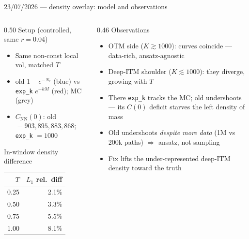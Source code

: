 \documentclass[aspectratio=169,11pt]{beamer}
\newcommand{\gold}[1]{{\color{ntugold}#1}}
\newcommand{\red}[1]{{\color{ntured}#1}}
\begin{document}
\begin{frame}{23/07/2026 --- density overlay: model and observations}
  \begin{columns}[T]
    \begin{column}{0.50\linewidth}
      \gold{Setup} (controlled, same $r{=}0.04$)
      \begin{itemize}\small
        \item Same non-const local vol, matched $T$
        \item old $1-e^{-N_c}$ (blue) vs \texttt{exp\_k} $e^{-kM}$ (red); MC (grey)
        \item $C_{\mathrm{NN}}(0)$: old $=903,895,883,868$;\; \texttt{exp\_k} $=1000$
      \end{itemize}
      \gold{In-window density difference}
      \begin{center}\scriptsize
      \begin{tabular}{rr}
        \toprule
        $T$ & $L_1$ rel.\ diff \\
        \midrule
        0.25 & 2.1\% \\
        0.50 & 3.3\% \\
        0.75 & 5.5\% \\
        1.00 & 8.1\% \\
        \bottomrule
      \end{tabular}
      \end{center}
    \end{column}
    \begin{column}{0.46\linewidth}
      \gold{Observations}
      \begin{itemize}\small
        \item OTM side ($K\gtrsim1000$): curves coincide --- data-rich, ansatz-agnostic
        \item Deep-ITM shoulder ($K\lesssim1000$): they diverge, growing with $T$
        \item There \red{\texttt{exp\_k} tracks the MC; old undershoots} --- its $C(0)$ deficit starves the left density of mass
        \item Old undershoots \emph{despite more data} (1M vs 200k paths) $\Rightarrow$ ansatz, not sampling
        \item Fix lifts the under-represented deep-ITM density toward the truth
      \end{itemize}
    \end{column}
  \end{columns}
\end{frame}
\end{document}
